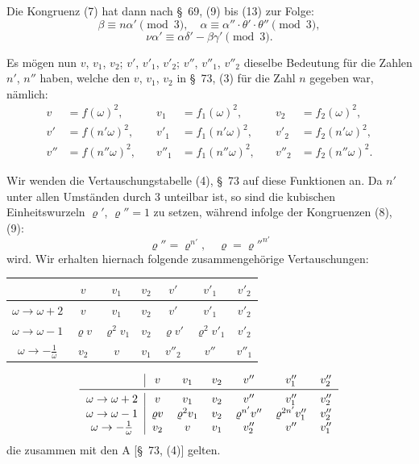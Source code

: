 \documentclass[12pt,a4paper]{article}
\theoremstyle{definition}
\begin{document}
Die Kongruenz (7) hat dann nach \S\ 69, (9) bis (13) zur Folge:
\begin{equation}\label{eq:76-8}
\beta \equiv n\alpha' \pmod{3}, \quad \alpha \equiv \alpha'' \cdot \theta' \cdot \theta'' \pmod{3},
\end{equation}
\begin{equation}\label{eq:76-9}
\nu\alpha' \equiv \alpha\delta' - \beta\gamma' \pmod{3}.
\end{equation}

Es mögen nun $v$, $v_1$, $v_2$; $v'$, $v'_1$, $v'_2$; $v''$, $v''_1$, $v''_2$ dieselbe Bedeutung für die Zahlen $n'$, $n''$ haben, welche den $v$, $v_1$, $v_2$ in \S\ 73, (3) für die Zahl $n$ gegeben war, nämlich:
\[
\begin{aligned}
v &= f(\omega)^2, &\quad v_1 &= f_1(\omega)^2, &\quad v_2 &= f_2(\omega)^2, \\
v' &= f(n'\omega)^2, &\quad v'_1 &= f_1(n'\omega)^2, &\quad v'_2 &= f_2(n'\omega)^2, \\
v'' &= f(n''\omega)^2, &\quad v''_1 &= f_1(n''\omega)^2, &\quad v''_2 &= f_2(n''\omega)^2.
\end{aligned}
\]

Wir wenden die Vertauschungstabelle (4), \S\ 73 auf diese Funktionen an. Da $n'$ unter allen Umständen durch 3 unteilbar ist, so sind die kubischen Einheitswurzeln $\varrho'$, $\varrho'' = 1$ zu setzen, während infolge der Kongruenzen (8), (9):
\begin{equation}\label{eq:76-11}
\varrho'' = \varrho^{n'}, \quad \varrho = \varrho''^{n'}
\end{equation}
wird. Wir erhalten hiernach folgende zusammengehörige Vertauschungen:

\begin{center}
\begin{tabular}{c|cccccc}
& $v$ & $v_1$ & $v_2$ & $v'$ & $v'_1$ & $v'_2$ \\
\midrule
$\omega \to \omega + 2$ & $v$ & $v_1$ & $v_2$ & $v'$ & $v'_1$ & $v'_2$ \\
$\omega \to \omega - 1$ & $\varrho v$ & $\varrho^2 v_1$ & $v_2$ & $\varrho v'$ & $\varrho^2 v'_1$ & $v'_2$ \\
$\omega \to -\frac{1}{\omega}$ & $v_2$ & $v$ & $v_1$ & $v''_2$ & $v''$ & $v''_1$ \\
\end{tabular}
\end{center}

\begin{equation}\label{eq:76-12}
\begin{tabular}{c|cccccc}
& $v$ & $v_1$ & $v_2$ & $v''$ & $v''_1$ & $v''_2$ \\
\midrule
$\omega \to \omega + 2$ & $v$ & $v_1$ & $v_2$ & $v''$ & $v''_1$ & $v''_2$ \\
$\omega \to \omega - 1$ & $\varrho v$ & $\varrho^2 v_1$ & $v_2$ & $\varrho^{n'} v''$ & $\varrho^{2n'} v''_1$ & $v''_2$ \\
$\omega \to -\frac{1}{\omega}$ & $v_2$ & $v$ & $v_1$ & $v''_2$ & $v''$ & $v''_1$ \\
\end{tabular}
\end{equation}
die zusammen mit den A [\S\ 73, (4)] gelten.
\end{document}
